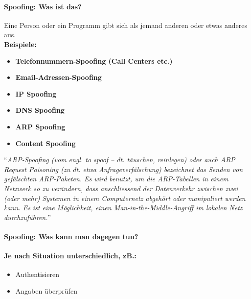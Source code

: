 \documentclass[10pt,a4paper]{article}
\begin{document}
\paragraph*{Spoofing: Was ist das?}
Eine Person oder ein Programm gibt sich als jemand anderen oder etwas anderes aus.\\
\textbf{Beispiele:}
\begin{itemize}[noitemsep,topsep=0pt,leftmargin=*]
    \item \textbf{Telefonnummern-Spoofing (Call Centers etc.)}
    \item \textbf{Email-Adressen-Spoofing}
    \item \textbf{IP Spoofing}
    \item \textbf{DNS Spoofing}
    \item \textbf{ARP Spoofing}
    \item \textbf{Content Spoofing}
\end{itemize}
\vspace{0.5cm}
\noindent
"`\textsl{ARP-Spoofing (vom engl. to spoof – dt. täuschen, reinlegen) oder auch ARP Request Poisoning (zu dt. etwa Anfrageverfälschung) bezeichnet das Senden von gefälschten ARP-Paketen. Es wird benutzt, um die ARP-Tabellen in einem Netzwerk so zu verändern, dass anschliessend der Datenverkehr zwischen zwei (oder mehr) Systemen in einem Computernetz abgehört oder manipuliert werden kann. Es ist eine Möglichkeit, einen Man-in-the-Middle-Angriff im lokalen Netz durchzuführen.}"'\cite{wiki}

\paragraph*{Spoofing: Was kann man dagegen tun?}
\paragraph*{Je nach Situation unterschiedlich, zB.:}
\begin{itemize}[noitemsep,topsep=0pt,leftmargin=*]
    \item {Authentisieren}
    \item {Angaben überprüfen}
\end{itemize}
\end{document}
